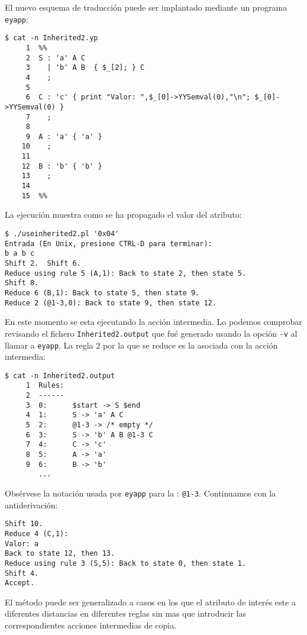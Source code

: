 El nuevo esquema de traducción puede ser implantado mediante
un programa \verb|eyapp|:

\begin{verbatim}
$ cat -n Inherited2.yp
     1  %%
     2  S : 'a' A C
     3    | 'b' A B  { $_[2]; } C
     4    ;
     5
     6  C : 'c' { print "Valor: ",$_[0]->YYSemval(0),"\n"; $_[0]->YYSemval(0) }
     7    ;
     8
     9  A : 'a' { 'a' }
    10    ;
    11
    12  B : 'b' { 'b' }
    13    ;
    14
    15  %%
\end{verbatim}

La ejecución muestra como se ha propagado el valor del atributo:
\begin{verbatim}
$ ./useinherited2.pl '0x04'
Entrada (En Unix, presione CTRL-D para terminar):
b a b c
Shift 2.  Shift 6.
Reduce using rule 5 (A,1): Back to state 2, then state 5.
Shift 8.
Reduce 6 (B,1): Back to state 5, then state 9.
Reduce 2 (@1-3,0): Back to state 9, then state 12.
\end{verbatim}

En este momento se esta ejecutando la acción intermedia.
Lo podemos comprobar revisando el fichero \verb|Inherited2.output|
que fué generado usando la opción \verb|-v| al llamar a \verb|eyapp|.
La regla 2 por la que se reduce es la asociada con la acción 
intermedia:

\begin{verbatim}
$ cat -n Inherited2.output
     1  Rules:
     2  ------
     3  0:      $start -> S $end
     4  1:      S -> 'a' A C
     5  2:      @1-3 -> /* empty */
     6  3:      S -> 'b' A B @1-3 C
     7  4:      C -> 'c'
     8  5:      A -> 'a'
     9  6:      B -> 'b'
        ...
\end{verbatim}

Obsérvese la notación usada por \verb|eyapp| para la 
: \verb|@1-3|.
Continuamos con la antiderivación:

\begin{verbatim}
Shift 10.
Reduce 4 (C,1): 
Valor: a
Back to state 12, then 13.
Reduce using rule 3 (S,5): Back to state 0, then state 1.
Shift 4.
Accept.
\end{verbatim}

El método puede ser generalizado a casos en los
que el atributo de interés este a diferentes distancias en
diferentes reglas sin mas que introducir las correspondientes
acciones intermedias de copia.

